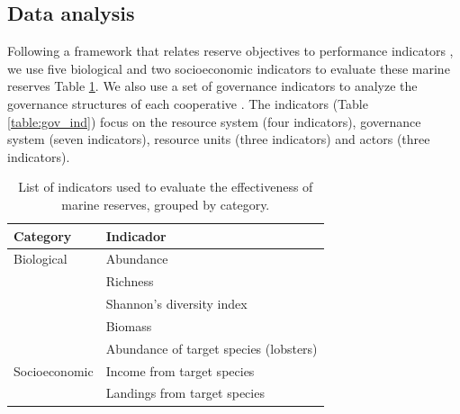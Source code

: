 \documentclass{frontiersSCNS}
\theoremstyle{definition}
\theoremstyle{definition}
\theoremstyle{definition}
\theoremstyle{remark}
\begin{document}
\subsection{Data analysis}\label{data-analysis}

Following a framework that relates reserve objectives to performance
indicators \citep{Villasenor-Derbez_2018}, we use five biological and
two socioeconomic indicators to evaluate these marine reserves Table
\ref{table:indicators}. We also use a set of governance indicators to
analyze the governance structures of each cooperative
\citep{leslie_2015-na}. The indicators (Table \ref{table:gov_ind}) focus
on the resource system (four indicators), governance system (seven
indicators), resource units (three indicators) and actors (three
indicators).

\begin{table}[H]

\caption{\label{tab:unnamed-chunk-3}\label{table:indicators}List of indicators used to evaluate the effectiveness of marine reserves, grouped by category.}
\centering
\begin{tabular}[t]{l|l}
\hline
Category & Indicador\\
\hline
Biological & Abundance\\
\hline
 & Richness\\
\hline
 & Shannon's diversity index\\
\hline
 & Biomass\\
\hline
 & Abundance of target species (lobsters)\\
\hline
Socioeconomic & Income from target species\\
\hline
 & Landings from target species\\
\hline
\end{tabular}
\end{table}
\end{document}
